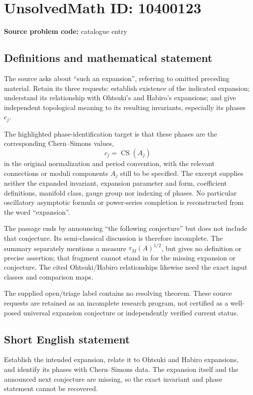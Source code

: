 \documentclass[11pt]{article}
\begin{document}
\section*{UnsolvedMath ID: 10400123}
\textbf{Source problem code:} catalogue entry
\subsection{Definitions and mathematical statement}
The source asks about ``such an expansion'', referring to omitted preceding material. Retain its three requests: establish existence of the indicated expansion; understand its relationship with Ohtsuki's and Habiro's expansions; and give independent topological meaning to its resulting invariants, especially its phases \(c_j\).

The highlighted phase-identification target is that these phases are the corresponding Chern--Simons values,
\[
 c_j=\operatorname{CS}(A_j)
\]
in the original normalization and period convention, with the relevant connections or moduli components \(A_j\) still to be specified. The excerpt supplies neither the expanded invariant, expansion parameter and form, coefficient definitions, manifold class, gauge group nor indexing of phases. No particular oscillatory asymptotic formula or power-series completion is reconstructed from the word ``expansion''.

The passage ends by announcing ``the following conjecture'' but does not include that conjecture. Its semi-classical discussion is therefore incomplete. The summary separately mentions a measure \(\tau_M(A)^{1/2}\), but gives no definition or precise assertion; that fragment cannot stand in for the missing expansion or conjecture. The cited Ohtsuki/Habiro relationships likewise need the exact input classes and comparison maps.

The supplied open/triage label contains no resolving theorem. These source requests are retained as an incomplete research program, not certified as a well-posed universal expansion conjecture or independently verified current status.
\subsection{Short English statement}
Establish the intended expansion, relate it to Ohtsuki and Habiro expansions, and identify its phases with Chern--Simons data. The expansion itself and the announced next conjecture are missing, so the exact invariant and phase statement cannot be recovered.
\end{document}
